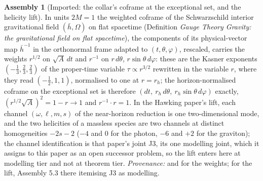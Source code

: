 \documentclass[11pt]{article}
\theoremstyle{definition}
\newtheorem{assembled}[theorem]{Assembly}
\theoremstyle{plain}
\newcommand{\changedmark}[2]{\marginpar{\raggedright\scriptsize\color{#1}#2}}
\providecommand{\hb}{}\renewcommand{\hb}{\bar{h}}
\begin{document}
\begin{assembled}[Imported: the collar's coframe at the exceptional set, and the helicity lift]\label{c:scrambling.imported-collars-coframe-exceptional-set-helicity}
\changedmark{gray}{reworded}
In units $2M = 1$ the weighted coframe of the Schwarzschild interior gravitational field $(\hb, \Omega)$ on flat spacetime (Definition \emph{Gauge Theory Gravity: the gravitational field on flat spacetime}), the components of its physical-vector map $\hb^{-1}$ in the orthonormal frame adapted to $(t, \theta, \varphi)$, rescaled, carries the weights $r^{1/2}$ on $\sqrt{A}\,dt$ and $r^{-1}$ on $r\,d\theta$, $r\sin\theta\,d\varphi$: these are the Kasner exponents $(-\tfrac13, \tfrac23, \tfrac23)$ of the proper-time variable $\tau \propto r^{3/2}$ rewritten in the variable $r$, where they read $(-\tfrac12, 1, 1)$, normalised to one at $r = r_h$; the horizon-normalised coframe on the exceptional set is therefore $(dt,\ r_h\,d\theta,\ r_h\sin\theta\,d\varphi)$ exactly, $(r^{1/2}\sqrt{A})^2 = 1 - r \to 1$ and $r^{-1}\cdot r = 1$. In the Hawking paper's lift, each channel $(\omega, \ell, m, s)$ of the near-horizon reduction is one two-dimensional mode, and the two helicities of a massless species are two channels at distinct homogeneities $-2s - 2$ ($-4$ and $0$ for the photon, $-6$ and $+2$ for the graviton); the channel identification is that paper's joint J3, its one modelling joint, which it assigns to this paper as an open successor problem, so the lift enters here at modelling tier and not at theorem tier. \emph{Provenance:} \cite[Lemmas 5.1 to 5.3, Def.~5.5]{ButlerT6} and \cite[Thm.~8.16]{ButlerT4} for the weights; \cite[Fact~5.1, Prop.~5.2, Assembly~5.3]{ButlerT7} for the lift, Assembly 5.3 there itemising J3 as modelling.
\end{assembled}
\end{document}
